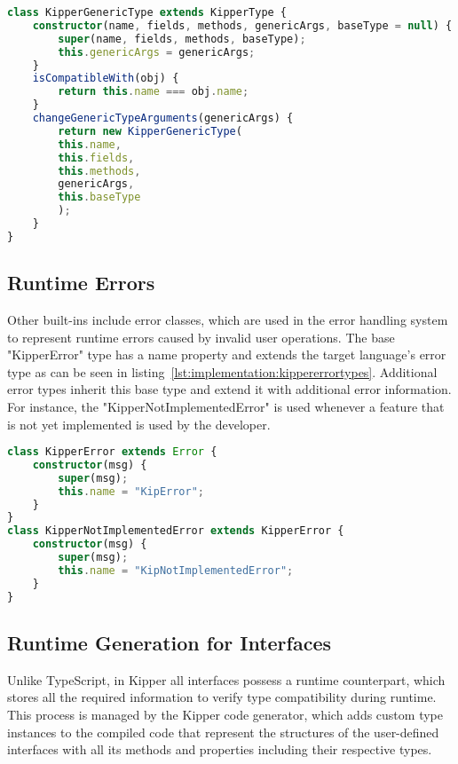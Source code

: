 \begin{lstlisting}[language=Typescript,caption=Generic Kipper Type,label=lst:implementation:generickippertype]
class KipperGenericType extends KipperType {
	constructor(name, fields, methods, genericArgs, baseType = null) {
		super(name, fields, methods, baseType);
		this.genericArgs = genericArgs;
	}
	isCompatibleWith(obj) {
		return this.name === obj.name;
	}
	changeGenericTypeArguments(genericArgs) {
		return new KipperGenericType(
		this.name,
		this.fields,
		this.methods,
		genericArgs,
		this.baseType
		);
	}
}
\end{lstlisting}

\subsection{Runtime Errors}

Other built-ins include error classes, which are used in the error handling system to represent runtime errors caused by invalid user operations. The base "KipperError" type has a name property and extends the target language's error type as can be seen in listing~\ref{lst:implementation:kippererrortypes}. Additional error types inherit this base type and extend it with additional error information. For instance, the "KipperNotImplementedError" is used whenever a feature that is not yet implemented is used by the developer.

\begin{lstlisting}[language=Typescript,caption=Kipper error types,label=lst:implementation:kippererrortypes]
class KipperError extends Error {
	constructor(msg) {
		super(msg);
		this.name = "KipError";
	}
}
class KipperNotImplementedError extends KipperError {
	constructor(msg) {
		super(msg);
		this.name = "KipNotImplementedError";
	}
}
\end{lstlisting}

\subsection{Runtime Generation for Interfaces}

Unlike TypeScript, in Kipper all interfaces possess a runtime counterpart, which stores all the required information to verify type compatibility during runtime. This process is managed by the Kipper code generator, which adds custom type instances to the compiled code that represent the structures of the user-defined interfaces with all its methods and properties including their respective types.

